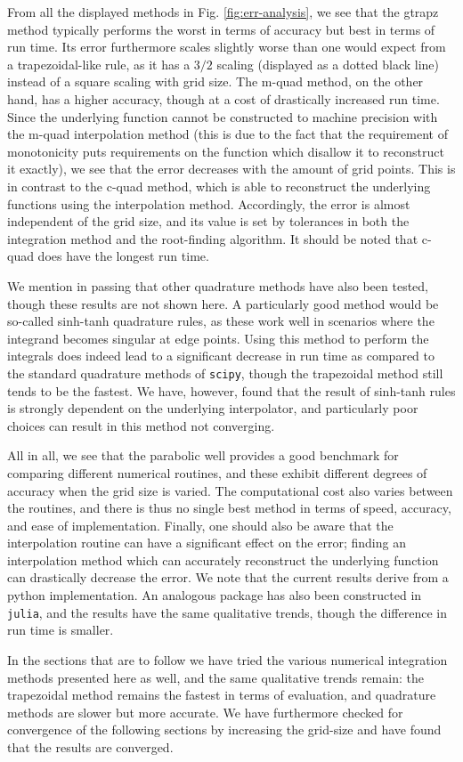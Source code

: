 From all the displayed methods in Fig. \ref{fig:err-analysis}, we see that the gtrapz method typically performs the worst in terms of accuracy but best in terms of run time. Its error furthermore scales slightly worse than one would expect from a trapezoidal-like rule, as it has a $3/2$ scaling (displayed as a dotted black line) instead of a square scaling with grid size. The m-quad method, on the other hand, has a higher accuracy, though at a cost of drastically increased run time. Since the underlying function cannot be constructed to machine precision with the m-quad interpolation method (this is due to the fact that the requirement of monotonicity puts requirements on the function which disallow it to reconstruct it exactly), we see that the error decreases with the amount of grid points. This is in contrast to the c-quad method, which is able to reconstruct the underlying functions using the interpolation method. Accordingly, the error is almost independent of the grid size, and its value is set by tolerances in both the integration method and the root-finding algorithm. It should be noted that c-quad does have the longest run time. \par 
We mention in passing that other quadrature methods have also been tested, though these results are not shown here. A particularly good method would be so-called sinh-tanh quadrature rules, as these work well in scenarios where the integrand becomes singular at edge points\cite{takahasi1974double}. Using this method to perform the integrals does indeed lead to a significant decrease in run time as compared to the standard quadrature methods of \texttt{scipy}, though the trapezoidal method still tends to be the fastest. We have, however, found that the result of sinh-tanh rules is strongly dependent on the underlying interpolator, and particularly poor choices can result in this method not converging. \par
All in all, we see that the parabolic well provides a good benchmark for comparing different numerical routines, and these exhibit different degrees of accuracy when the grid size is varied. The computational cost also varies between the routines, and there is thus no single best method in terms of speed, accuracy, and ease of implementation. Finally, one should also be aware that the interpolation routine can have a significant effect on the error; finding an interpolation method which can accurately reconstruct the underlying function can drastically decrease the error. We note that the current results derive from a python implementation. An analogous package has also been constructed in \texttt{julia}, and the results have the same qualitative trends, though the difference in run time is smaller. \par 
In the sections that are to follow we have tried the various numerical integration methods presented here as well, and the same qualitative trends remain: the trapezoidal method remains the fastest in terms of evaluation, and quadrature methods are slower but more accurate. We have furthermore checked for convergence of the following sections by increasing the grid-size and have found that the results are converged.


